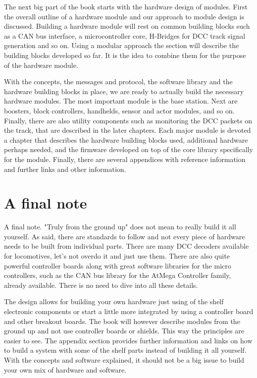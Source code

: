 The next big part of the book starts with the hardware design of modules. First the overall outline of a hardware module and our approach to module design is discussed. Building a hardware module will rest on common building blocks such as a CAN bus interface, a microcontroller core, H-Bridges for DCC track signal generation and so on. Using a modular approach the section will describe the building blocks developed so far. It is the idea to combine them for the purpose of the hardware module.

With the concepts, the messages and protocol, the software library and the hardware building blocks in place, we are ready to actually build the necessary hardware modules. The most important module is the base station. Next are boosters, block controllers, handhelds, sensor and actor modules, and so on. Finally, there are also utility components such as monitoring the DCC packets on the track, that are described in the later chapters. Each major module is devoted a chapter that describes the hardware building blocks used, additional hardware perhaps needed, and the firmware developed on top of the core library specifically for the module. Finally, there are several appendices with reference information and further links and other information.

\section*{A final note}

A final note. "Truly from the ground up" does not mean to really build it all yourself. As said, there are standards to follow and not every piece of hardware needs to be built from individual parts. There are many DCC decoders available for locomotives, let's not overdo it and just use them. There are also quite powerful controller boards along with great software libraries for the micro controllers, such as the CAN bus library for the AtMega Controller family, already available. There is no need to dive into all these details.

The design allows for building your own hardware just using of the shelf electronic components or start a little more integrated by using a controller board and other breakout boards. The book will however describe modules from the ground up and not use controller boards or shields. This way the principles are easier to see. The appendix section provides further information and links on how to build a system with some of the shelf parts instead of building it all yourself. With the concepts and software explained, it should not be a big issue to build your own mix of hardware and software.

